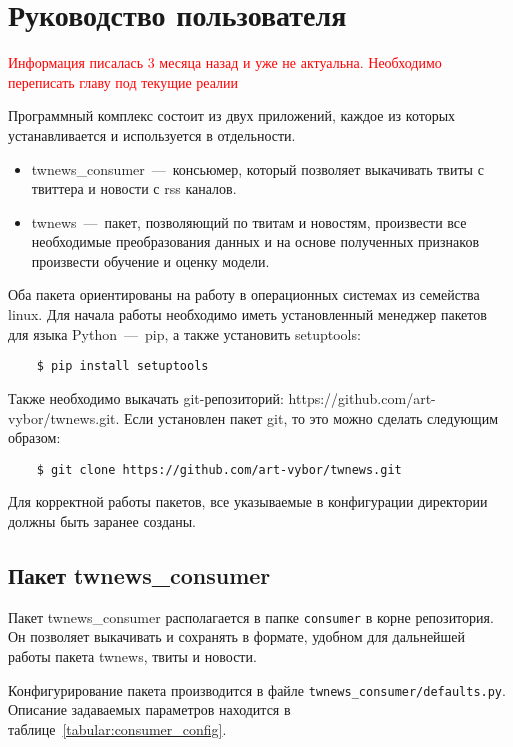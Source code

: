 \section{Руководство пользователя}
\label{sec:documentation}
    \textcolor{red}{Информация писалась 3 месяца назад и уже не актуальна. Необходимо переписать главу под текущие реалии}

    Программный комплекс состоит из двух приложений, каждое из которых устанавливается и используется в отдельности.
    \begin{itemize}
        \item twnews\_consumer~---~консьюмер, который позволяет выкачивать твиты с твиттера и новости с rss каналов.
        \item twnews~---~пакет, позволяющий по твитам и новостям, произвести все необходимые преобразования данных и на основе полученных признаков произвести обучение и оценку модели.
    \end{itemize}

    Оба пакета ориентированы на работу в операционных системах из семейства linux. Для начала работы необходимо иметь установленный менеджер пакетов для языка Python~---~pip, а также установить setuptools:
    \begin{lstlisting}
    $ pip install setuptools
    \end{lstlisting}
    Также необходимо выкачать git-репозиторий: https://github.com/art-vybor/twnews.git.
    Если установлен пакет git, то это можно сделать следующим образом:
    \begin{lstlisting}
    $ git clone https://github.com/art-vybor/twnews.git
    \end{lstlisting}

    Для корректной работы пакетов, все указываемые в конфигурации директории должны быть заранее созданы.

    \subsection{Пакет twnews\_consumer}
        Пакет twnews\_consumer располагается в папке \lstinline{consumer} в корне репозитория.
        Он позволяет выкачивать и сохранять в формате, удобном для дальнейшей работы пакета twnews, твиты и новости.

        Конфигурирование пакета производится в файле \lstinline{twnews_consumer/defaults.py}.
        Описание задаваемых параметров находится в таблице~\ref{tabular:consumer_config}.

